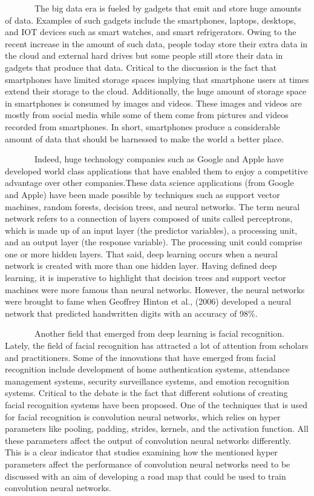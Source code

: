 \documentclass[
  12pt,
]{article}
\begin{document}
~~~~~~~The big data era is fueled by gadgets that emit and store huge
amounts of data. Examples of such gadgets include the smartphones,
laptops, desktops, and IOT devices such as smart watches, and smart
refrigerators. Owing to the recent increase in the amount of such data,
people today store their extra data in the cloud and external hard
drives but some people still store their data in gadgets that produce
that data. Critical to the discussion is the fact that smartphones have
limited storage spaces implying that smartphone users at times extend
their storage to the cloud. Additionally, the huge amount of storage
space in smartphones is consumed by images and videos. These images and
videos are mostly from social media while some of them come from
pictures and videos recorded from smartphones. In short, smartphones
produce a considerable amount of data that should be harnessed to make
the world a better place.

~~~~~~~Indeed, huge technology companies such as Google and Apple have
developed world class applications that have enabled them to enjoy a
competitive advantage over other companies.These data science
applications (from Google and Apple) have been made possible by
techniques such as support vector machines, random forests, decision
trees, and neural networks. The term neural network refers to a
connection of layers composed of units called perceptrons, which is made
up of an input layer (the predictor variables), a processing unit, and
an output layer (the response variable). The processing unit could
comprise one or more hidden layers. That said, deep learning occurs when
a neural network is created with more than one hidden layer. Having
defined deep learning, it is imperative to highlight that decision trees
and support vector machines were more famous than neural networks.
However, the neural networks were brought to fame when Geoffrey Hinton
et al., (2006) developed a neural network that predicted handwritten
digits with an accuracy of 98\%.

~~~~~~~Another field that emerged from deep learning is facial
recognition. Lately, the field of facial recognition has attracted a lot
of attention from scholars and practitioners. Some of the innovations
that have emerged from facial recognition include development of home
authentication systems, attendance management systems, security
surveillance systems, and emotion recognition systems. Critical to the
debate is the fact that different solutions of creating facial
recognition systems have been proposed. One of the techniques that is
used for facial recognition is convolution neural networks, which relies
on hyper parameters like pooling, padding, strides, kernels, and the
activation function. All these parameters affect the output of
convolution neural networks differently. This is a clear indicator that
studies examining how the mentioned hyper parameters affect the
performance of convolution neural networks need to be discussed with an
aim of developing a road map that could be used to train convolution
neural networks.
\end{document}
